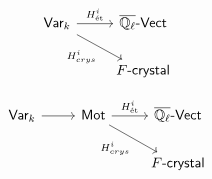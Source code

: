 




\[
\begin{tikzcd}
    \category{Var}_{k} \arrow{r}{H^{i}_{\text{\'et}}} 
    \arrow{rd}[swap]{H^{i}_{crys}} &
\overline{\mathbb{Q}_{\ell}}\category{-Vect} \\
    {} &
    \category{\(F\)-crystal}
\end{tikzcd}
\]

\vspace{20em}

\[
\begin{tikzcd}
    \category{Var}_{k} \arrow{r} & \category{Mot} \arrow{r}{H^{i}_{\text{\'et}}} 
    \arrow{rd}[swap]{H^{i}_{crys}} &
\overline{\mathbb{Q}_{\ell}}\category{-Vect} \\
    {} & {} &
    \category{\(F\)-crystal}
\end{tikzcd}
\]





